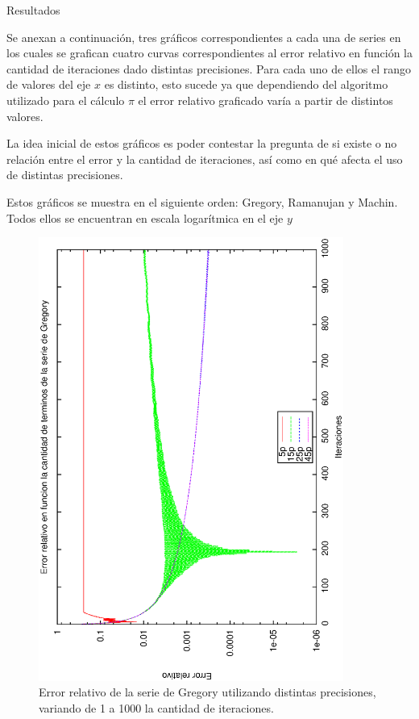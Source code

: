 \begin{section}{Resultados}
	\VSP
	
	Se anexan a continuación, tres gráficos correspondientes a cada una de series en los cuales se grafican cuatro curvas correspondientes al error relativo en función la cantidad de iteraciones dado distintas precisiones. Para cada uno de ellos el rango de valores del eje $x$ es distinto, esto sucede ya que dependiendo del algoritmo utilizado para el cálculo $\pi$ el error relativo graficado varía a partir de distintos valores.
	
	La idea inicial de estos gráficos es poder contestar la pregunta de si existe o no relación entre el error y la cantidad de iteraciones, así como en qué afecta el uso de distintas precisiones.
	
	Estos gráficos se muestra en el siguiente orden: Gregory, Ramanujan y Machin. Todos ellos se encuentran en escala logarítmica en el eje $y$


	\begin{figure}[H]
	  \centering
		\includegraphics[width=10cm,angle=-90]{graficos/gregory_1a1000it.eps}
	  \caption{Error relativo de la serie de Gregory utilizando distintas precisiones, variando de 1 a 1000 la cantidad de iteraciones.}
	  \label{fig:gregory_1000it}
	\end{figure}
	

\end{section}
